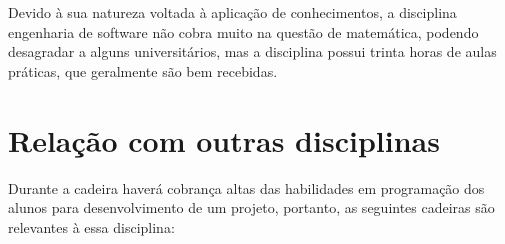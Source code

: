 \documentclass[10pt]{article}
\begin{document}
Devido à sua natureza voltada à aplicação de conhecimentos, a disciplina engenharia de software não cobra muito na questão de matemática, podendo desagradar a alguns universitários, mas a disciplina possui trinta horas de aulas práticas, que geralmente são bem recebidas.  

\section{Relação com outras disciplinas}
Durante a cadeira haverá cobrança altas das habilidades em programação dos alunos para desenvolvimento de um projeto\citep{Cronograma2014}, portanto, as seguintes cadeiras são relevantes à essa disciplina:

\begin{table}[h]
\end{table}



\end{document}
